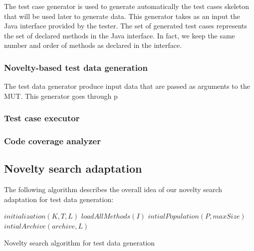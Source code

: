 \documentclass[conference]{IEEEtran}
\begin{document}
The test case generator is used to generate automatically the test cases skeleton that will be used later to generate data. This generator takes as an input the Java interface provided by the tester. The set of generated test cases represents the set of declared methods in the Java interface. In fact, we keep the same number and order of methods as declared in the interface.
\subsubsection{Novelty-based test data generation}

The test data generator produce input data that are passed as arguments to the MUT. This generator goes through p
\subsubsection{Test case executor}
\subsubsection{Code coverage analyzer}



\subsection{Novelty search adaptation}

The following algorithm describes the overall idea of our novelty search adaptation for test data generation:

\begin{algorithm}

	\DontPrintSemicolon
	$initialization(K, T, L)$\;
	$loadAllMethods(I)$\;
	$intialPopulation(P,maxSize)  $\;
	$intialArchive(archive,L)  $\;
	
	\;
	
	
	\caption{{\sc Novelty search algorithm for test data generation }}
	\label{algo:NS}
\end{algorithm}
\end{document}
